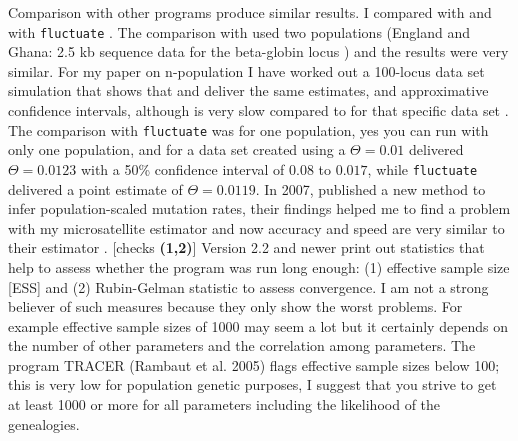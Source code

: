 Comparison with other programs produce similar results. I compared
\migrate with \genetree \citep{Bahlo:2000:IGT} and with
{\tt fluctuate} \citep{Kuhner1998-429}. The comparison with \genetree
used two populations (England and Ghana: 2.5 kb sequence data for the 
beta-globin locus \citep{harding1997-772}) and the results were very similar.
For my paper on n-population I have worked out a 100-locus data set simulation
that shows that \genetree and \migrate deliver the same estimates, and
approximative confidence intervals, although
\genetree is very slow compared to \migrate  for that specific
data set \citep{beerli:2001:mle}.
\vskip 0.7cm 
The comparison with {\tt fluctuate} was for one population, yes you can run \migrate with only one population, and for a data set
created using a $\Theta=0.01$ \migrate delivered $\Theta=0.0123$
with a 50\% confidence interval of $0.08$ to $0.017$, 
while {\tt fluctuate} delivered a point estimate of $\Theta=0.0119$. 
\vskip 0.7cm
In 2007, \citeauthor{roychoudhury:2007:fae} published a new method to infer population-scaled mutation rates, their findings helped me to find a problem with my microsatellite estimator and now accuracy and speed are very similar to their estimator \citep[Figure \ref{fig:msatcomp}][]{beerli:2007:eps}. 
[checks {\bf (1,2)}] 
\vskip 0.7cm
\migrate Version 2.2 and newer print out statistics that help to assess whether the program was run long enough: (1) effective sample size [ESS] and (2) Rubin-Gelman statistic to assess convergence. I am not a strong believer of such measures because they only show the worst problems. For example effective sample sizes of 1000 may seem a lot but it certainly depends on the number of other parameters and the correlation among parameters. The program TRACER (Rambaut et al. 2005) flags effective sample sizes below 100; this is very low for population genetic purposes, I suggest that you strive to get at least 1000 or more for all parameters including the likelihood of the genealogies.
\vskip 1cm
